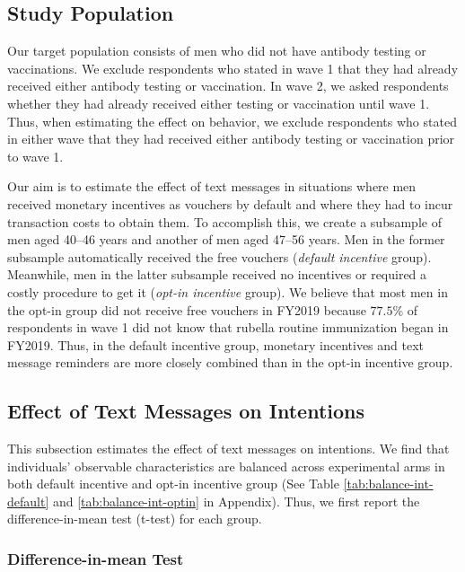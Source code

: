 \documentclass[
]{article}
\begin{document}
\hypertarget{sample}{%
\subsection{Study Population}\label{sample}}

Our target population consists of men who did not have antibody testing or vaccinations. We exclude respondents who stated in wave 1 that they had already received either antibody testing or vaccination. In wave 2, we asked respondents whether they had already received either testing or vaccination until wave 1. Thus, when estimating the effect on behavior, we exclude respondents who stated in either wave that they had received either antibody testing or vaccination prior to wave 1.

Our aim is to estimate the effect of text messages in situations where men received monetary incentives as vouchers by default and where they had to incur transaction costs to obtain them. To accomplish this, we create a subsample of men aged 40--46 years and another of men aged 47--56 years. Men in the former subsample automatically received the free vouchers (\emph{default incentive} group). Meanwhile, men in the latter subsample received no incentives or required a costly procedure to get it (\emph{opt-in incentive} group). We believe that most men in the opt-in group did not receive free vouchers in FY2019 because \(77.5\)\% of respondents in wave 1 did not know that rubella routine immunization began in FY2019. Thus, in the default incentive group, monetary incentives and text message reminders are more closely combined than in the opt-in incentive group.

\hypertarget{intention}{%
\subsection{Effect of Text Messages on Intentions}\label{intention}}

This subsection estimates the effect of text messages on intentions. We find that individuals' observable characteristics are balanced across experimental arms in both default incentive and opt-in incentive group (See Table \ref{tab:balance-int-default} and \ref{tab:balance-int-optin} in Appendix). Thus, we first report the difference-in-mean test (t-test) for each group.

\hypertarget{difference-in-mean-test}{%
\subsubsection{Difference-in-mean Test}\label{difference-in-mean-test}}
\end{document}
